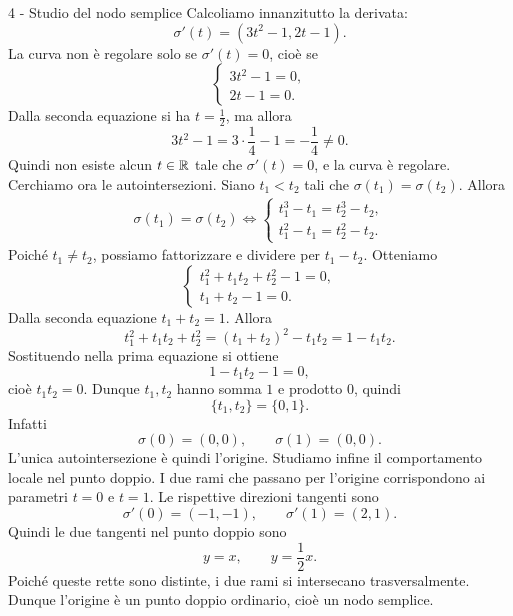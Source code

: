 \documentclass[a4paper]{article}
\begin{document}
\begin{snippetsolution}{4 - Studio del nodo semplice}
    Calcoliamo innanzitutto la derivata:
    \[
        \sigma'(t)=\left(3t^2-1,2t-1\right).
    \]
    La curva non è regolare solo se \(\sigma'(t)=0\), cioè se
    \[
        \begin{cases}
            3t^2-1=0,\\
            2t-1=0.
        \end{cases}
    \]
    Dalla seconda equazione si ha \(t=\frac12\), ma allora
    \[
        3t^2-1=3\cdot\frac14-1=-\frac14\neq 0.
    \]
    Quindi non esiste alcun \(t\in\mathbb{R}\) tale che \(\sigma'(t)=0\), e la curva è regolare.
    Cerchiamo ora le autointersezioni. Siano \(t_1<t_2\) tali che \(\sigma(t_1)=\sigma(t_2)\). Allora
    \begin{align*}
        \sigma(t_1)=\sigma(t_2)
        \iff
        \begin{cases}
            t_1^3-t_1=t_2^3-t_2,\\
            t_1^2-t_1=t_2^2-t_2.
        \end{cases}
    \end{align*}
    Poiché \(t_1\neq t_2\), possiamo fattorizzare e dividere per \(t_1-t_2\). Otteniamo
    \[
        \begin{cases}
            t_1^2+t_1t_2+t_2^2-1=0,\\
            t_1+t_2-1=0.
        \end{cases}
    \]
    Dalla seconda equazione \(t_1+t_2=1\). Allora
    \[
        t_1^2+t_1t_2+t_2^2=(t_1+t_2)^2-t_1t_2=1-t_1t_2.
    \]
    Sostituendo nella prima equazione si ottiene
    \[
        1-t_1t_2-1=0,
    \]
    cioè \(t_1t_2=0\). Dunque \(t_1,t_2\) hanno somma \(1\) e prodotto \(0\), quindi
    \[
        \{t_1,t_2\}=\{0,1\}.
    \]
    Infatti
    \[
        \sigma(0)=(0,0),
        \qquad
        \sigma(1)=(0,0).
    \]
    L'unica autointersezione è quindi l'origine.
    Studiamo infine il comportamento locale nel punto doppio. I due rami che passano per l'origine corrispondono ai parametri \(t=0\) e \(t=1\). Le rispettive direzioni tangenti sono
    \[
        \sigma'(0)=(-1,-1),
        \qquad
        \sigma'(1)=(2,1).
    \]
    Quindi le due tangenti nel punto doppio sono
    \[
        y=x,
        \qquad
        y=\frac12x.
    \]
    Poiché queste rette sono distinte, i due rami si intersecano trasversalmente. Dunque l'origine è un punto doppio ordinario, cioè un nodo semplice.
\end{snippetsolution}
\end{document}
